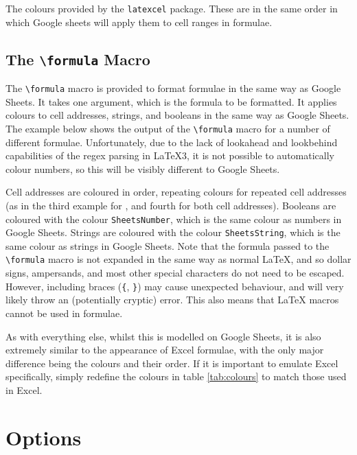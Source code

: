 \documentclass[table]{article}
\newcommand{\loadexampleleft}[1]{
    \qoinputlisting[mdframed options = {nobreak=true}]{examples/#1.tex}
    \begin{centeredbox}[before upper = {}]
        
    \end{centeredbox}
}
\newcommand{\cell}[2][SheetsOrange]{
    {\notomono\formula{#2}}
}
\begin{document}
\begin{table}[h!]
    \caption{The colours provided by the \texttt{latexcel} package. These are in the same order in which Google sheets will apply them to cell ranges in formulae.}
    \label{tab:colours}
\end{table}

\subsection{The \texttt{\textbackslash formula} Macro}

The \verb|\formula| macro is provided to format formulae in the same way as Google Sheets. It takes one argument, which is the formula to be formatted. It applies colours to cell addresses, strings, and booleans in the same way as Google Sheets. The example below shows the output of the \verb|\formula| macro for a number of different formulae. Unfortunately, due to the lack of lookahead and lookbehind capabilities of the regex parsing in \LaTeX3, it is not possible to automatically colour numbers, so this will be visibly different to Google Sheets.

\loadexampleleft{formula_colours}

Cell addresses are coloured in order, repeating colours for repeated cell addresses (as in the third example for \cell{A2}, and fourth for both cell addresses). Booleans are coloured with the colour \texttt{SheetsNumber}, which is the same colour as numbers in Google Sheets. Strings are coloured with the colour \texttt{SheetsString}, which is the same colour as strings in Google Sheets. Note that the formula passed to the \verb|\formula| macro is not expanded in the same way as normal \LaTeX{}, and so dollar signs, ampersands, and most other special characters do not need to be escaped. However, including braces (\texttt{\{}, \texttt{\}}) may cause unexpected behaviour, and will very likely throw an (potentially cryptic) error. This also means that \LaTeX{} macros cannot be used in formulae.

As with everything else, whilst this is modelled on Google Sheets, it is also extremely similar to the appearance of Excel formulae, with the only major difference being the colours and their order. If it is important to emulate Excel specifically, simply redefine the colours in table \ref{tab:colours} to match those used in Excel.

\section{Options}
\end{document}
